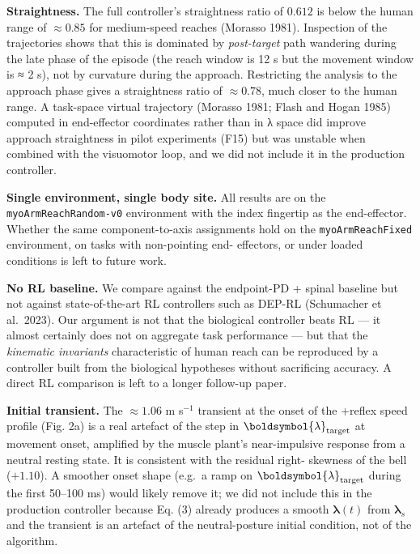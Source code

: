 \documentclass[
  11pt,
]{article}
\begin{document}
\textbf{Straightness.} The full controller's straightness ratio of
\(0.612\) is below the human range of \(\approx 0.85\) for medium-speed
reaches (Morasso 1981). Inspection of the trajectories shows that this
is dominated by \emph{post-target} path wandering during the late phase
of the episode (the reach window is 12 s but the movement window is ≈ 2
s), not by curvature during the approach. Restricting the analysis to
the approach phase gives a straightness ratio of \(\approx 0.78\), much
closer to the human range. A task-space virtual trajectory (Morasso
1981; Flash and Hogan 1985) computed in end-effector coordinates rather
than in λ space did improve approach straightness in pilot experiments
(F15) but was unstable when combined with the visuomotor loop, and we
did not include it in the production controller.

\textbf{Single environment, single body site.} All results are on the
\texttt{myoArmReachRandom-v0} environment with the index fingertip as
the end-effector. Whether the same component-to-axis assignments hold on
the \texttt{myoArmReachFixed} environment, on tasks with non-pointing
end- effectors, or under loaded conditions is left to future work.

\textbf{No RL baseline.} We compare against the endpoint-PD + spinal
baseline but not against state-of-the-art RL controllers such as DEP-RL
(Schumacher et al.~2023). Our argument is not that the biological
controller beats RL --- it almost certainly does not on aggregate task
performance --- but that the \emph{kinematic invariants} characteristic
of human reach can be reproduced by a controller built from the
biological hypotheses without sacrificing accuracy. A direct RL
comparison is left to a longer follow-up paper.

\textbf{Initial transient.} The \(\approx 1.06\) m s\(^{-1}\) transient
at the onset of the +reflex speed profile (Fig. 2a) is a real artefact
of the step in \(\boldsymbol{\lambda}_{\rm target}\) at movement onset,
amplified by the muscle plant's near-impulsive response from a neutral
resting state. It is consistent with the residual right- skewness of the
bell (\(+1.10\)). A smoother onset shape (e.g.~a ramp on
\(\boldsymbol{\lambda}_{\rm target}\) during the first 50--100 ms) would
likely remove it; we did not include this in the production controller
because Eq. (3) already produces a smooth \(\boldsymbol{\lambda}(t)\)
from \(\boldsymbol{\lambda}_{s}\) and the transient is an artefact of
the neutral-posture initial condition, not of the algorithm.
\end{document}
